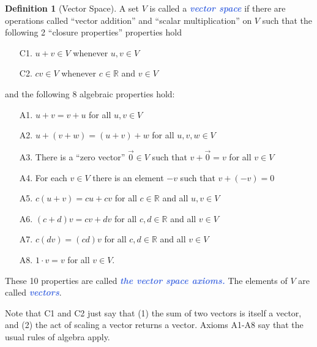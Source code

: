 \documentclass[10pt]{article}
\newcommand{\demph}[1]{\textcolor{RoyalBlue}{\textbf{\slshape #1}}} %
\theoremstyle{definition}
\newtheorem{definition}[theorem]{Definition}
\newcommand{\R}{\mathbb{R}}           %
\begin{document}
\begin{definition}[Vector Space]
  \label{def:vector-space}
  A set $V$ is called a \demph{vector space} if there are operations called
  ``vector addition'' and ``scalar multiplication'' on $V$ such that the
  following 2 ``closure properties'' properties hold
  \begin{enumerate}
    \item [C1.] $u+v\in V$ whenever $u,v\in V$ 
    \item [C2.] $cv\in V$ whenever $c\in \R$ and $v\in V$ 
  \end{enumerate}
  and the following 8 algebraic properties hold:
  \begin{enumerate}
    \item [A1.] $u+v=v+u$ for all $u,v\in V$ 
    \item [A2.] $u+(v+w)=(u+v)+w$ for all $u,v,w\in V$ 
    \item [A3.] There is a ``zero vector'' $\vec{0}\in V$ such that $v+\vec{0}=v$
    for all $v\in V$ 
    \item [A4.] For each $v\in V$ there is an element $-v$ such that $v+(-v)=0$ 
    \item [A5.] $c(u+v)=cu+cv$ for all $c\in \R$ and all $u,v\in V$ 
    \item [A6.] $(c+d)v=cv+dv$ for all $c,d\in\R$ and all $v\in V$ 
    \item [A7.] $c(dv)=(cd)v$ for all $c,d\in \R$ and all $v\in V$ 
    \item [A8.] $1\cdot v=v$ for all $v\in V$. 
  \end{enumerate}
  These 10 properties are called \demph{the vector space axioms.} The elements
  of $V$ are called \demph{vectors}.
  
  Note that C1 and C2 just say that (1) the sum of two vectors is itself a
  vector, and (2) the act of scaling a vector returns a vector. Axioms A1-A8
  say that the usual rules of algebra apply.
\end{definition}
\end{document}

